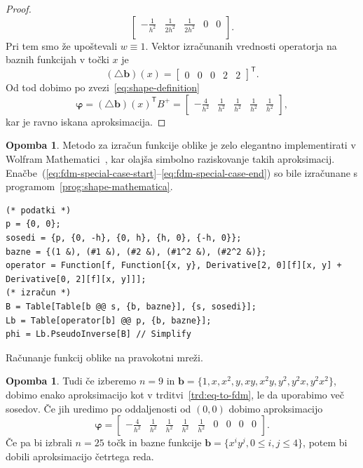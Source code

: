 \documentclass[12pt,a4paper,twoside]{article}
\theoremstyle{definition} %
\newtheorem{opomba}[definicija]{Opomba}
\theoremstyle{plain} %
\numberwithin{equation}{section}
\newcommand{\T}{\mathsf{T}}
\newcommand{\lap}{\triangle}
\renewcommand{\b}{\boldsymbol}
\renewcommand{\phi}{\varphi}
\begin{document}
\begin{proof}
\begin{equation}
\begin{bmatrix}
 -\frac{1}{h^2} & \frac{1}{2 h^2} & \frac{1}{2 h^2} & 0 & 0 \\
  \end{bmatrix}.
\end{equation}
Pri tem smo že upoštevali $w \equiv 1$.
Vektor izračunanih vrednosti operatorja na baznih funkcijah v točki $x$ je
\begin{equation}
   (\lap \b{b})(x) = \begin{bmatrix} 0 & 0 & 0 & 2 & 2 \end{bmatrix}^\T.
\end{equation}
Od tod dobimo po zvezi~\eqref{eq:shape-definition}
\begin{equation}
  \label{eq:fdm-special-case-end}
  \b\phi = (\lap \b b)(x)^\T B^{+} =
  \begin{bmatrix}
    -\frac{4}{h^2} & \frac{1}{h^2} & \frac{1}{h^2} & \frac{1}{h^2} &
    \frac{1}{h^2}
  \end{bmatrix},
\end{equation}
kar je ravno iskana aproksimacija.
\end{proof}
\begin{opomba}
  Metodo za izračun funkcije oblike je zelo elegantno implementirati v
  Wolfram Mathematici~\cite{mathematica}, kar olajša simbolno raziskovanje takih aproksimacij.
  Enačbe~(\ref{eq:fdm-special-case-start}--\ref{eq:fdm-special-case-end}) so bile izračunane s
  programom~\ref{prog:shape-mathematica}.

\begin{listing}[!h]
    \vspace{-1ex}
  \begin{verbatim}
(* podatki *)
p = {0, 0};
sosedi = {p, {0, -h}, {0, h}, {h, 0}, {-h, 0}};
bazne = {(1 &), (#1 &), (#2 &), (#1^2 &), (#2^2 &)};
operator = Function[f, Function[{x, y}, Derivative[2, 0][f][x, y] + Derivative[0, 2][f][x, y]]];
(* izračun *)
B = Table[Table[b @@ s, {b, bazne}], {s, sosedi}];
Lb = Table[operator[b] @@ p, {b, bazne}];
phi = Lb.PseudoInverse[B] // Simplify
  \end{verbatim}
  \vspace{-3ex}
  \caption{Računanje funkcij oblike na pravokotni mreži.}
  \label{prog:shape-mathematica}
  \end{listing}
\end{opomba}
\begin{opomba}
  \label{op:fdm-9}
  Tudi če izberemo $n=9$ in $\b b = \{1, x, x^2, y, xy, x^2y, y^2, y^2x, y^2
  x^2 \}$, dobimo enako aproksimacijo kot v trditvi~\ref{trd:eq-to-fdm}, le da
  uporabimo več sosedov. Če jih uredimo po oddaljenosti od $(0, 0)$ dobimo
  aproksimacijo
  \begin{equation}
    \b\phi =  \begin{bmatrix}
    -\frac{4}{h^2} & \frac{1}{h^2} & \frac{1}{h^2} & \frac{1}{h^2} &
    \frac{1}{h^2} & 0 & 0 & 0 & 0
  \end{bmatrix}.
    \label{eq:shape-mon9}
  \end{equation}
 Če pa bi izbrali $n=25$ točk in bazne funkcije $\b b = \{x^iy^j, 0 \leq i, j
 \leq 4 \}$, potem bi dobili aproksimacijo četrtega reda.
\end{opomba}
\end{document}

